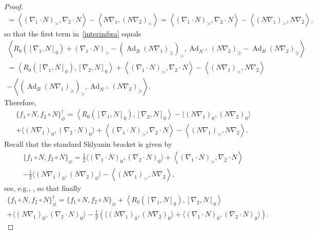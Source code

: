 \documentclass{amsart}
\theoremstyle{definition}
\theoremstyle{remark}
\numberwithin{equation}{section}
\numberwithin{theorem}{section}
\def\Ad{\operatorname{Ad}}
\begin{document}
\begin{proof}
\begin{multline*}
=\left\langle (\nabla_1{\cdot} N)_>,\nabla_2{\cdot} N\right\rangle-\left\langle N\nabla_1, (N\nabla_2)_<\right\rangle
=\left\langle (\nabla_1{\cdot} N)_>,\nabla_2{\cdot} N\right\rangle-\left\langle (N\nabla_1)_>, N\nabla_2\right\rangle,
\end{multline*}
so that the first term in~\eqref{interimbra} equals
\begin{multline*}
\left\langle R_0([\nabla_1,N]_0)+(\nabla_1{\cdot} N)_>-(\Ad_B(N\nabla_1)_\ge)_>,
\Ad_{N^{-1}}(N\nabla_2)_\ge-\Ad_B(N\nabla_2)_\ge\right\rangle\\
=\left\langle R_0([\nabla_1,N]_0),[\nabla_2,N]_0\right\rangle+
\left\langle (\nabla_1{\cdot} N)_>,\nabla_2{\cdot} N\right\rangle-\left\langle (N\nabla_1)_>, N\nabla_2\right\rangle\\
-\left\langle (\Ad_B(N\nabla_1)_\ge)_>,\Ad_{N^{-1}}(N\nabla_2)_\ge\right\rangle.
\end{multline*}
Therefore,
\begin{multline*}
\{f_1\circ N,f_2\circ N\}_\varnothing^\dag=\left\langle R_0([\nabla_1,N]_0),[\nabla_2,N]_0\right\rangle
-\langle (N\nabla_1)_0,(N\nabla_2)_0\rangle\\+\langle (N\nabla_1)_0,(\nabla_2{\cdot} N)_0\rangle
+\left\langle (\nabla_1{\cdot} N)_>,\nabla_2{\cdot} N\right\rangle-\left\langle (N\nabla_1)_>, N\nabla_2\right\rangle.
\end{multline*}
Recall that the standard Sklyanin bracket is given by
\begin{multline*}
\{f_1\circ N,f_2\circ N\}_\varnothing=\frac12\langle(\nabla_1{\cdot} N)_0,(\nabla_2{\cdot} N)_0\rangle
+\left\langle (\nabla_1{\cdot} N)_>,\nabla_2{\cdot} N\right\rangle\\-\frac12\langle (N\nabla_1)_0,(N\nabla_2)_0\rangle
-\left\langle (N\nabla_1)_>, N\nabla_2\right\rangle,
\end{multline*}
see, e.g., \cite[p.~9]{GSVMem}, so that finally
\begin{multline}\label{finalbra}
\{f_1\circ N,f_2\circ N\}_\varnothing^\dag=\{f_1\circ N,f_2\circ N\}_\varnothing+\left\langle R_0([\nabla_1,N]_0),[\nabla_2,N]_0\right\rangle\\
+\langle (N\nabla_1)_0,(\nabla_2{\cdot} N)_0\rangle-\frac12\left(\langle (N\nabla_1)_0,(N\nabla_2)_0\rangle
+\langle(\nabla_1{\cdot} N)_0,(\nabla_2{\cdot} N)_0\rangle\right).
\end{multline}


\end{proof}
\end{document}
